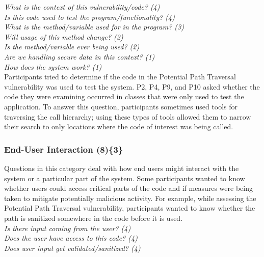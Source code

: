 \documentclass{sig-alternate}
\begin{document}
\noindent\emph{What is the context of this vulnerability/code? (4)} \\
\emph{Is this code used to test the program/functionality? (4)} \\
\emph{What is the method/variable used for in the program? (3)} \\
\emph{Will usage of this method change? (2)} \\
\emph{Is the method/variable ever being used? (2)} \\
\emph{Are we handling secure data in this context? (1)} \\
\emph{How does the system work? (1)} 
\\


Participants tried to determine if the code in the Potential Path Traversal vulnerability was used to test the system. 
P2, P4, P9, and P10 asked whether the code they were examining occurred in classes that were only used to test the application. 
To answer this question, participants sometimes used tools for traversing the call hierarchy; using these types of tools allowed them to narrow their search to only locations where the code of interest was being called.




\subsubsection{\textbf{End-User Interaction (8)\{3\}}}
\label{eui}

Questions in this category deal with how end users might interact with the system or a particular part of the system. 
Some participants wanted to know whether users could access critical parts of the code and if measures were being taken to mitigate potentially malicious activity. 
For example, while assessing the Potential Path Traversal vulnerability, participants wanted to know whether the path is sanitized somewhere in the code before it is used.
\\

\noindent\emph{Is there input coming from the user? (4)} \\
\emph{Does the user have access to this code? (4)} \\
\emph{Does user input get validated/sanitized? (4)} 
\\
\end{document}
